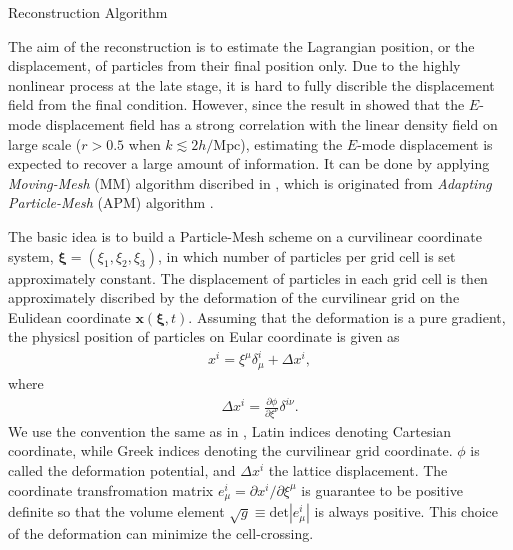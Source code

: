 \begin{section}{Reconstruction Algorithm}
  \label{sec:reconstruction}
  
The aim of the reconstruction is to estimate the Lagrangian position, or 
the displacement, of particles from their final position only. 
Due to the highly nonlinear process at the late stage, it is hard to 
fully discrible the displacement field from the final condition. 
However, since the result in \cite{bib:Yu2016} showed that the $E$-mode 
displacement field has a strong correlation with the linear density field 
on large scale ($r > 0.5$ when $k \lesssim 2 h/\mathrm{Mpc}$), estimating the 
$E$-mode displacement is expected to recover a large amount of information. 
It can be done by applying \textit{Moving-Mesh} (MM) algorithm discribed in 
\cite{bib:ZhuH2016}, which is originated from \textit{Adapting Particle-Mesh} 
(APM) algorithm \cite{bib:Pen1995,bib:Pen1998}.

The basic idea is to build a Particle-Mesh scheme on a curvilinear 
coordinate system, $\bm{\xi}=\left(\xi_1,\xi_2,\xi_3\right)$, in 
which number of particles per grid cell is set approximately constant. 
The displacement of particles in each grid cell is then approximately 
discribed by the deformation of the curvilinear grid on the Eulidean 
coordinate $\bm{x}(\bm{\xi},t)$.
Assuming that the deformation is a pure gradient, the physicsl position of 
particles on Eular coordinate is given as
\begin{align}
    x^i=\xi ^\mu \delta ^i _\mu + \Delta x^i,
\end{align}
where
\begin{align}
  \label{eq:disp}
    \Delta x^i=\frac{\partial \phi}{\partial \xi ^ \nu}\delta ^{i \nu} .
\end{align}
We use the convention the same as in \cite{bib:Pen1995}, Latin indices denoting 
Cartesian coordinate, while Greek indices denoting the curvilinear grid coordinate.
$\phi$ is called the deformation potential, and $\Delta x^i$ the lattice
displacement.
The coordinate transfromation matrix $e^i_\mu = \partial x^i / \partial \xi ^ \mu$
is guarantee to be positive definite so that the volume element 
$\sqrt{g} \equiv \mathrm{det}\left| e^i_\mu\right|$ is always positive. 
This choice of the deformation can minimize the cell-crossing.


\end{section}
